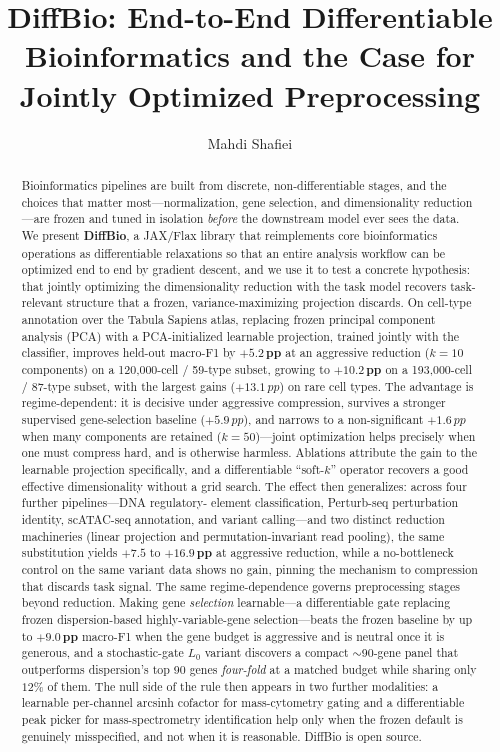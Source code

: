 \documentclass[10pt,twocolumn]{article}
\title{\vspace{-1.2em}\textbf{DiffBio: End-to-End Differentiable Bioinformatics and the Case for\\ Jointly Optimized Preprocessing}}
\author[ ]{Mahdi Shafiei}
\affil[ ]{\small Avitai Bio \\ \texttt{mahdi@avitai.bio}}
\date{}
\newcommand{\pp}{\,pp}
\begin{document}
\maketitle

\begin{abstract}
\noindent
Bioinformatics pipelines are built from discrete, non-differentiable stages, and the
choices that matter most---normalization, gene selection, and dimensionality
reduction---are frozen and tuned in isolation \emph{before} the downstream model ever
sees the data. We present \textbf{DiffBio}, a JAX/Flax library that reimplements core
bioinformatics operations as differentiable relaxations so that an entire analysis
workflow can be optimized end to end by gradient descent, and we use it to test a
concrete hypothesis: that jointly optimizing the dimensionality reduction with the task
model recovers task-relevant structure that a frozen, variance-maximizing projection
discards. On cell-type annotation over the Tabula Sapiens atlas, replacing frozen
principal component analysis (PCA) with a PCA-initialized learnable projection, trained
jointly with the classifier, improves held-out macro-F1 by
$\mathbf{+5.2\pp}$ at an aggressive reduction ($k{=}10$ components) on a
120{,}000-cell / 59-type subset, growing to $\mathbf{+10.2\pp}$ on a
193{,}000-cell / 87-type subset, with the largest gains ($+13.1\pp$) on rare cell types.
The advantage is regime-dependent: it is decisive under aggressive compression, survives
a stronger supervised gene-selection baseline ($+5.9\pp$), and narrows to a
non-significant $+1.6\pp$ when many components are retained ($k{=}50$)---joint
optimization helps precisely when one must compress hard, and is otherwise harmless.
Ablations attribute the gain to the learnable projection specifically, and a
differentiable ``soft-$k$'' operator recovers a good effective dimensionality without a
grid search. The effect then generalizes: across four further pipelines---DNA regulatory-
element classification, Perturb-seq perturbation identity, scATAC-seq annotation, and
variant calling---and two distinct reduction machineries (linear projection and
permutation-invariant read pooling), the same substitution yields $\mathbf{+7.5}$ to
$\mathbf{+16.9\pp}$ at aggressive reduction, while a no-bottleneck control on the same
variant data shows no gain, pinning the mechanism to compression that discards task signal.
The same regime-dependence governs preprocessing stages beyond reduction. Making gene
\emph{selection} learnable---a differentiable gate replacing frozen dispersion-based
highly-variable-gene selection---beats the frozen baseline by up to $\mathbf{+9.0\pp}$
macro-F1 when the gene budget is aggressive and is neutral once it is generous, and a
stochastic-gate $L_0$ variant discovers a compact $\sim$90-gene panel that outperforms
dispersion's top 90 genes \emph{four-fold} at a matched budget while sharing only $12\%$ of
them. The null side of the rule then appears in two further modalities: a learnable
per-channel arcsinh cofactor for mass-cytometry gating and a differentiable peak picker for
mass-spectrometry identification help only when the frozen default is genuinely
misspecified, and not when it is reasonable. DiffBio is open source.
\end{abstract}
\end{document}
